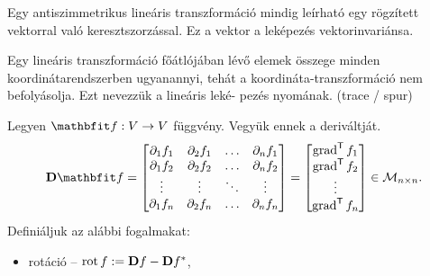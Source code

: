 \documentclass[lang=magyar]{math-handout}
\begin{document}
\begin{definition}[Vektorinvariáns]
  Egy antiszimmetrikus lineáris transzformáció mindig leírható egy rögzített
  vektorral való keresztszorzással. Ez a vektor a leképezés vektorinvariánsa.
\end{definition}

\begin{statement}
  Egy lineáris transzformáció főátlójában lévő elemek összege minden
  koordinátarendszerben ugyanannyi, tehát a koordináta-transzformáció nem
  befolyásolja. Ezt nevezzük a lineáris leké- pezés nyomának. (trace / spur)
\end{statement}

\begin{note}
  Legyen $\rvec f: V \rightarrow V$ függvény. Vegyük ennek a deriváltját.
  \[
    \Diff\rvec f
    =
    \begin{bmatrix}
      \partial_1 f_1 & \partial_2 f_1 & \dots  & \partial_n f_1 \\
      \partial_1 f_2 & \partial_2 f_2 & \dots  & \partial_n f_2 \\
      \vdots         & \vdots         & \ddots & \vdots         \\
      \partial_1 f_n & \partial_2 f_n & \dots  & \partial_n f_n
    \end{bmatrix}
    =
    \begin{bmatrix}
      \grad^\transpose f_1 \\
      \grad^\transpose f_2 \\
      \vdots               \\
      \grad^\transpose f_n \\
    \end{bmatrix}
    \in
    \mathcal M_{n \times n}
    \text.
  \]
  Definiáljuk az alábbi fogalmakat:
  \begin{itemize}
    \item rotáció
          \tabto{2.4cm} – \tabto{3cm}
          $\operatorname{rot} f := \mathbf{D} f - \mathbf{D} f ^{*}$,


\end{itemize}
\end{note}
\end{document}
